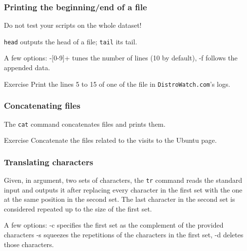 \documentclass{beamer}
\begin{document}
\begin{frame}
  \frametitle{Printing the beginning/end of a file}
  Do not test your scripts on the whole dataset!

  \vfill

  \texttt{head} outputs the head of a file; \texttt{tail} its
  tail.

  \vfill

  A few options: -[0-9]+ tunes the number of lines (10 by default), -f
  follows the appended data.

  \vfill
  \pause

  \begin{exampleblock}{Exercise}
    Print the lines 5 to 15 of one of the file in
    \texttt{DistroWatch.com}'s logs.
  \end{exampleblock}
\end{frame}

\begin{frame}
  \frametitle{Concatenating files}
  The \texttt{cat} command concatenates files and prints them.

  \vfill
  \pause

  \begin{exampleblock}{Exercise}
    Concatenate the files related to the visits to the Ubuntu page.
  \end{exampleblock}
\end{frame}

\begin{frame}
  \frametitle{Translating characters}
  Given, in argument, two sets of characters, the \texttt{tr} command
  reads the standard input and outputs it after replacing every
  character in the first set with the one at the same position in the
  second set. The last character in the second set is considered
  repeated up to the size of the first set.

  \vfill

  A few options: -c specifies the first set as the complement of the
  provided characters -s squeezes the repetitions of the characters in
  the first set, -d deletes those characters.
\end{frame}
\end{document}
